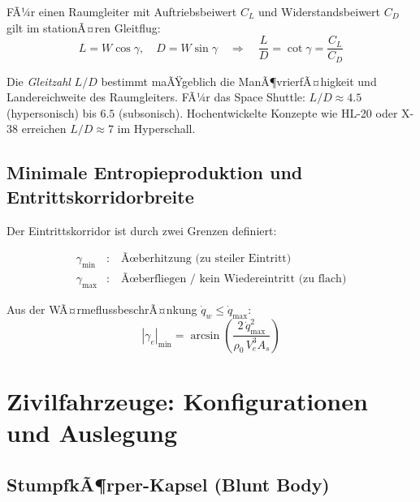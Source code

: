 ﻿\documentclass[12pt,a4paper]{article}
\begin{document}
FÃ¼r einen Raumgleiter mit Auftriebsbeiwert $C_L$ und Widerstandsbeiwert $C_D$
gilt im stationÃ¤ren Gleitflug:
\[
  L = W\cos\gamma, \quad D = W\sin\gamma
  \quad\Rightarrow\quad
  \frac{L}{D} = \cot\gamma = \frac{C_L}{C_D}
\]

Die \emph{Gleitzahl} $L/D$ bestimmt maÃŸgeblich die ManÃ¶vrierfÃ¤higkeit und
Landereichweite des Raumgleiters. FÃ¼r das Space Shuttle: $L/D \approx 4.5$
(hypersonisch) bis $6.5$ (subsonisch). Hochentwickelte Konzepte wie HL-20 oder
X-38 erreichen $L/D \approx 7$ im Hyperschall.

\subsection{Minimale Entropieproduktion und Entrittskorridorbreite}

Der Eintrittskorridor ist durch zwei Grenzen definiert:

\begin{align}
  \gamma_{\min} &: \quad \text{Ãœberhitzung (zu steiler Eintritt)} \\
  \gamma_{\max} &: \quad \text{Ãœberfliegen / kein Wiedereintritt (zu flach)}
\end{align}

Aus der WÃ¤rmeflussbeschrÃ¤nkung $\dot{q}_w \leq \dot{q}_{\max}$:
\[
  |\gamma_e|_{\min} = \arcsin\!\left(\frac{2\,\dot{q}_{\max}^2}{\rho_0\,V_e^3 A_s}\right)
\]

\section{Zivilfahrzeuge: Konfigurationen und Auslegung}

\subsection{StumpfkÃ¶rper-Kapsel (Blunt Body)}
\end{document}
